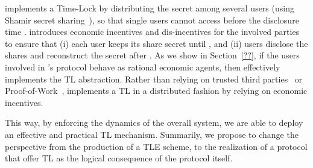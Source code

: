 \shortname implements a Time-Lock by distributing the secret \secret among several users (using Shamir secret sharing~\cite{Shamir:1979:SS:359168.359176}), so that single users cannot access  \secret before the disclosure time \td.
%
\shortname introduces economic incentives and dis-incentives for the involved parties to ensure that (i) each user keeps its share secret until \td, and (ii) 
users disclose the shares and reconstruct the secret after \td.
%
As we show in Section~\ref{??}, if the users involved in \shortname's protocol behave as rational economic agents, then \shortname effectively implements the TL abstraction.
%
Rather than relying on trusted third parties~\cite{?} or Proof-of-Work~\cite{?}, \shortname implements a TL in a distributed fashion by relying on economic incentives.

%
This way, by enforcing the dynamics of the overall system, we are able to deploy an effective and practical TL mechanism.
Summarily, we propose to change the perspective from the production of a TLE scheme, to the realization of a protocol that offer TL as the logical consequence of the protocol itself.




